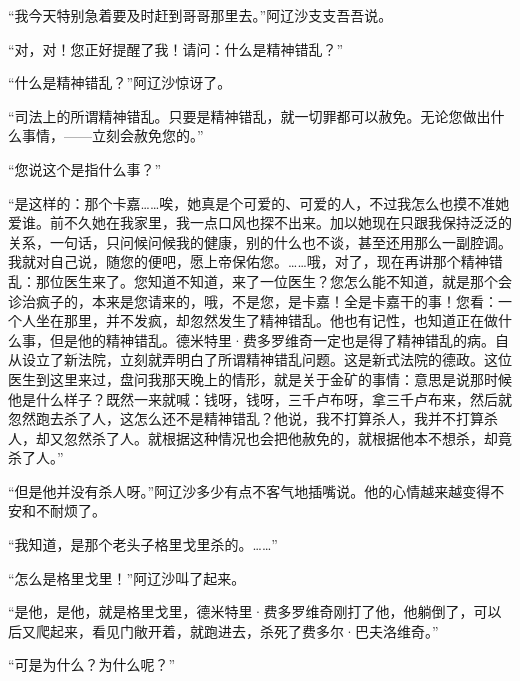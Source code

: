 \par “我今天特别急着要及时赶到哥哥那里去。”阿辽沙支支吾吾说。
\par “对，对！您正好提醒了我！请问：什么是精神错乱？”
\par “什么是精神错乱？”阿辽沙惊讶了。
\par “司法上的所谓精神错乱。只要是精神错乱，就一切罪都可以赦免。无论您做出什么事情，——立刻会赦免您的。”
\par “您说这个是指什么事？”
\par “是这样的：那个卡嘉……唉，她真是个可爱的、可爱的人，不过我怎么也摸不准她爱谁。前不久她在我家里，我一点口风也探不出来。加以她现在只跟我保持泛泛的关系，一句话，只问候问候我的健康，别的什么也不谈，甚至还用那么一副腔调。我就对自己说，随您的便吧，愿上帝保佑您。……哦，对了，现在再讲那个精神错乱：那位医生来了。您知道不知道，来了一位医生？您怎么能不知道，就是那个会诊治疯子的，本来是您请来的，哦，不是您，是卡嘉！全是卡嘉干的事！您看：一个人坐在那里，并不发疯，却忽然发生了精神错乱。他也有记性，也知道正在做什么事，但是他的精神错乱。德米特里·费多罗维奇一定也是得了精神错乱的病。自从设立了新法院，立刻就弄明白了所谓精神错乱问题。这是新式法院的德政。这位医生到这里来过，盘问我那天晚上的情形，就是关于金矿的事情：意思是说那时候他是什么样子？既然一来就喊：钱呀，钱呀，三千卢布呀，拿三千卢布来，然后就忽然跑去杀了人，这怎么还不是精神错乱？他说，我不打算杀人，我并不打算杀人，却又忽然杀了人。就根据这种情况也会把他赦免的，就根据他本不想杀，却竟杀了人。”
\par “但是他并没有杀人呀。”阿辽沙多少有点不客气地插嘴说。他的心情越来越变得不安和不耐烦了。
\par “我知道，是那个老头子格里戈里杀的。……”
\par “怎么是格里戈里！”阿辽沙叫了起来。
\par “是他，是他，就是格里戈里，德米特里·费多罗维奇刚打了他，他躺倒了，可以后又爬起来，看见门敞开着，就跑进去，杀死了费多尔·巴夫洛维奇。”
\par “可是为什么？为什么呢？”
